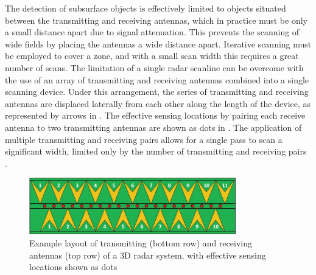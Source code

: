\documentclass[main.tex]{subfiles}
\begin{document}
The detection of subsurface objects is effectively limited to objects situated between the transmitting and receiving antennas, which in practice must be only a small distance apart due to signal attenuation. This prevents the scanning of wide fields by placing the antennas a wide distance apart. Iterative scanning must be employed to cover a zone, and with a small scan width this requires a great number of scans. The limitation of a single radar scanline can be overcome with the use of an array of transmitting and receiving antennas combined into a single scanning device. Under this arrangement, the series of transmitting and receiving antennas are displaced laterally from each other along the length of the device, as represented by arrows in . The effective sensing locations by pairing each receive antenna to two transmitting antennas are shown as dots in . The application of multiple transmitting and receiving pairs allows for a single pass to scan a significant width, limited only by the number of transmitting and receiving pairs \parencite{3dradarDX}. 
\begin{figure}[ht]
\centering
\includegraphics[width=0.8\textwidth]{2-LiteratureReview/3d-radar.png}
\caption[Example layout of transmitting and receiving antennas of a 3D radar system]{Example layout of transmitting (bottom row) and receiving antennas (top row) of a 3D radar system, with effective sensing locations shown as dots \parencite{3dradarDXG}}
\end{figure}
\end{document}
